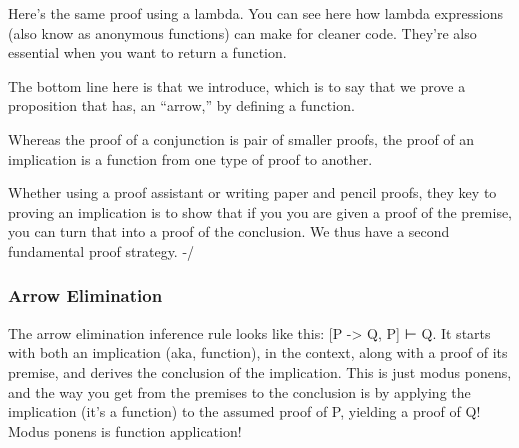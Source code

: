\documentclass[letterpaper,10pt,english]{sphinxmanual}
\begin{document}
Here’s the same proof using a lambda. You can see here how lambda
expressions (also know as anonymous functions) can make for cleaner
code.  They’re also essential when you want to return a function.

\begin{sphinxVerbatim}[commandchars=\\\{\}]
         

            
               
         
         
\end{sphinxVerbatim}

The bottom line here is that we introduce, which is to say that we
prove a proposition that has, an “arrow,” by defining a function.

Whereas the proof of a conjunction is pair of smaller proofs, the
proof of an implication is a function from one type of proof to
another.

Whether using a proof assistant or writing paper and pencil proofs,
they key to proving an implication is to show that if you  you
are given a proof of the premise, you can turn that into a proof of
the conclusion. We thus have a second fundamental proof strategy.  -/


\subsubsection{Arrow Elimination}
\label{\detokenize{15-proofs:arrow-elimination}}
The arrow elimination inference rule looks like this: {[}P -\textgreater{} Q, P{]}
⊢ Q. It starts with both an implication (aka, function), in the
context, along with a proof of its premise, and derives the conclusion
of the implication.  This is just modus ponens, and the way you get
from the premises to the conclusion is by applying the implication
(it’s a function) to the assumed proof of P, yielding a proof of Q!
Modus ponens is function application!
\end{document}
